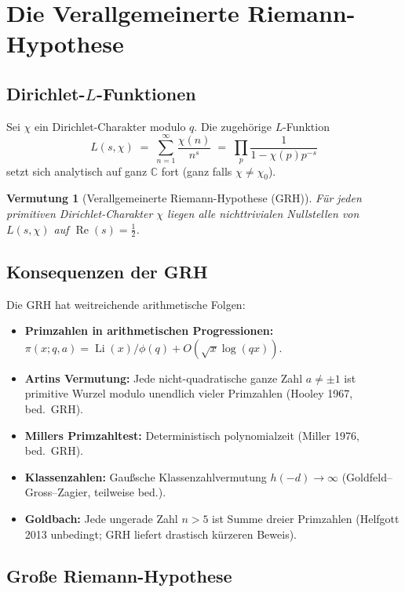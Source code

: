 \documentclass[12pt,a4paper]{article}
\newtheorem{vermutung}[theorem]{Vermutung}
\theoremstyle{remark}
\begin{document}
\section{Die Verallgemeinerte Riemann-Hypothese}

\subsection{Dirichlet-$L$-Funktionen}

Sei $\chi$ ein Dirichlet-Charakter modulo $q$.  Die zugehörige $L$-Funktion
\[
  L(s,\chi) \;=\; \sum_{n=1}^{\infty} \frac{\chi(n)}{n^s} \;=\; \prod_p \frac{1}{1-\chi(p)p^{-s}}
\]
setzt sich analytisch auf ganz $\mathbb{C}$ fort (ganz falls $\chi\neq\chi_0$).

\begin{vermutung}[Verallgemeinerte Riemann-Hypothese (GRH)]
  Für jeden primitiven Dirichlet-Charakter $\chi$ liegen alle nichttrivialen Nullstellen
  von $L(s,\chi)$ auf $\operatorname{Re}(s)=\tfrac{1}{2}$.
\end{vermutung}

\subsection{Konsequenzen der GRH}

Die GRH hat weitreichende arithmetische Folgen:
\begin{itemize}[nosep]
  \item \textbf{Primzahlen in arithmetischen Progressionen:}
    $\pi(x;q,a) = \operatorname{Li}(x)/\phi(q) + O(\sqrt{x}\log(qx))$.
  \item \textbf{Artins Vermutung:} Jede nicht-quadratische ganze Zahl $a\neq\pm1$
    ist primitive Wurzel modulo unendlich vieler Primzahlen (Hooley 1967, bed.\ GRH).
  \item \textbf{Millers Primzahltest:} Deterministisch polynomialzeit (Miller 1976,
    bed.\ GRH).
  \item \textbf{Klassenzahlen:} Gaußsche Klassenzahlvermutung $h(-d)\to\infty$
    (Goldfeld--Gross--Zagier, teilweise bed.).
  \item \textbf{Goldbach:} Jede ungerade Zahl $n>5$ ist Summe dreier Primzahlen
    (Helfgott 2013 unbedingt; GRH liefert drastisch kürzeren Beweis).
\end{itemize}

\subsection{Große Riemann-Hypothese}
\end{document}
